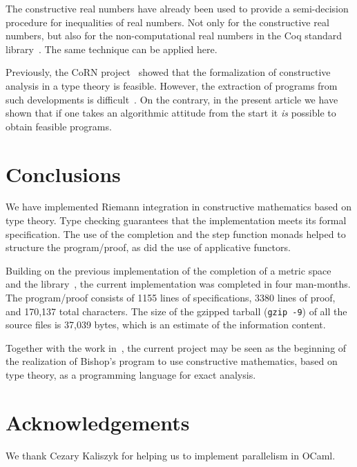 \documentclass{elsarticle}
\newcommand{\tmem}[1]{{\em #1\/}}
\begin{document}
The constructive real numbers have already been used to provide a
semi-decision procedure for inequalities of real numbers. Not only for the
constructive real numbers, but also for the non-computational real numbers in
the Coq standard library~{\cite{cekp8}}. The same technique can be applied
here.

Previously, the CoRN project~{\cite{corn}} showed that the formalization of
constructive analysis in a type theory is feasible. However, the extraction of
programs from such developments is difficult~{\cite{lcf:spi:03}}. On the
contrary, in the present article we have shown that if one takes an
algorithmic attitude from the start it {\tmem{is}} possible to obtain feasible
programs.

\section{Conclusions}

We have implemented Riemann integration in constructive mathematics based on
type theory. Type checking guarantees that the implementation meets its formal
specification. The use of the completion and the step function monads helped
to structure the program/proof, as did the use of applicative functors.

Building on the previous implementation of the completion of a metric
space~{\cite{OConnor:real}} and the library~{\cite{lcf:04}}, the current
implementation was completed in four man-months. The program/proof consists of
1155 lines of specifications, 3380 lines of proof, and 170,137 total
characters. The size of the gzipped tarball ({\texttt{gzip -9}}) of all the
source files is 37,039 bytes, which is an estimate of the information content.

Together with the work in~{\cite{OConnor:mscs,OConnor:real,OConnor:compact}},
the current project may be seen as the beginning of the realization of
Bishop's program to use constructive mathematics, based on type theory, as a
programming language for exact analysis.

\section{Acknowledgements}

We thank Cezary Kaliszyk for helping us to implement parallelism in OCaml.


\end{document}

